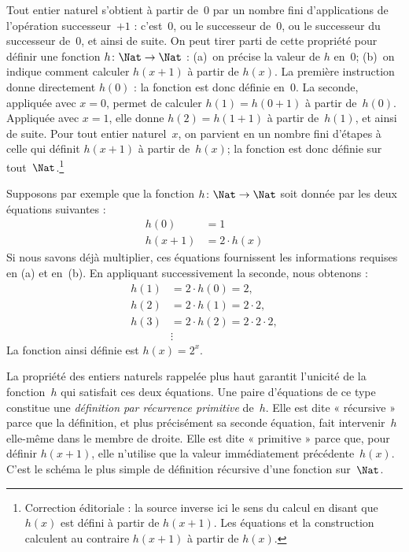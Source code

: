 \documentclass[../../../include/open-logic-section]{subfiles}
\begin{document}

Tout entier naturel s'obtient à partir de~$0$ par un nombre fini
d'applications de l'opération successeur~$+1$ : c'est~$0$, ou le
successeur de~$0$, ou le successeur du successeur de~$0$, et ainsi
de suite. On peut tirer parti de cette propriété pour définir une
fonction $h\colon\Nat\to\Nat$ : (a)~on précise la valeur de $h$
en~$0$; (b)~on indique comment calculer $h(x+1)$ à partir de
$h(x)$. La première instruction donne directement $h(0)$ : la
fonction est donc définie en~$0$. La seconde, appliquée avec $x=0$,
permet de calculer $h(1)=h(0+1)$ à partir de~$h(0)$. Appliquée avec
$x=1$, elle donne $h(2)=h(1+1)$ à partir de~$h(1)$, et ainsi de
suite. Pour tout entier naturel~$x$, on parvient en un nombre fini
d'étapes à celle qui définit $h(x+1)$ à partir de~$h(x)$; la fonction
est donc définie sur tout~$\Nat$.\footnote{Correction éditoriale : la source inverse ici le sens du calcul en disant que $h(x)$ est défini à partir de $h(x+1)$. Les équations et la construction calculent au contraire $h(x+1)$ à partir de $h(x)$.}

Supposons par exemple que la fonction $h\colon\Nat\to\Nat$ soit
donnée par les deux équations suivantes :
\begin{align*}
h(0) & =  1\\
h(x+1) & =  2 \cdot h(x)
\end{align*}
Si nous savons déjà multiplier, ces équations fournissent les
informations requises en (a) et en~(b). En appliquant successivement
la seconde, nous obtenons :
\begin{align*}
  h(1) & = 2\cdot h(0) = 2,\\
  h(2) & = 2\cdot h(1) = 2\cdot 2,\\
  h(3) & = 2 \cdot h(2) = 2\cdot 2 \cdot 2,\\
  & \vdots
\end{align*}
La fonction ainsi définie est $h(x)=2^x$.

La propriété des entiers naturels rappelée plus haut garantit
l'unicité de la fonction~$h$ qui satisfait ces deux équations. Une
paire d'équations de ce type constitue une \emph{définition par
récurrence primitive} de~$h$. Elle est dite « récursive » parce que
la définition, et plus précisément sa seconde équation, fait
intervenir~$h$ elle-même dans le membre de droite. Elle est dite
« primitive » parce que, pour définir $h(x+1)$, elle n'utilise que
la valeur immédiatement précédente~$h(x)$. C'est le schéma le plus
simple de définition récursive d'une fonction sur~$\Nat$.
\end{document}
